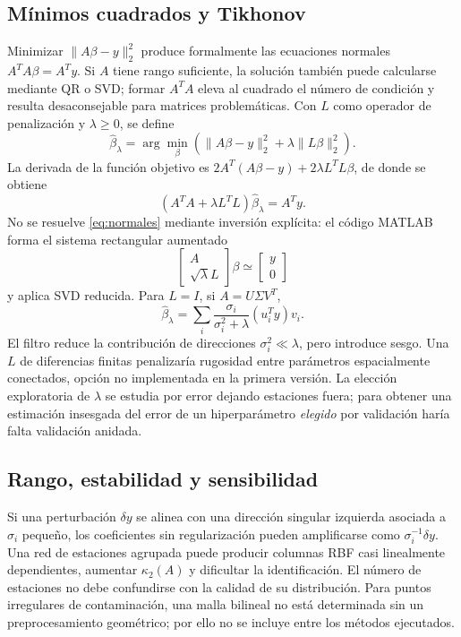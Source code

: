 \subsection{Mínimos cuadrados y Tikhonov}
Minimizar $\|A\beta-y\|_2^2$ produce formalmente las ecuaciones normales $A^TA\beta=A^Ty$. Si $A$ tiene rango suficiente, la solución también puede calcularse mediante QR o SVD; formar $A^TA$ eleva al cuadrado el número de condición y resulta desaconsejable para matrices problemáticas. Con $L$ como operador de penalización y $\lambda\geq0$, se define
\begin{equation}\widehat\beta_\lambda=\arg\min_\beta\left(\|A\beta-y\|_2^2+\lambda\|L\beta\|_2^2\right).\label{eq:tikh}\end{equation}
La derivada de la función objetivo es $2A^T(A\beta-y)+2\lambda L^TL\beta$, de donde se obtiene
\begin{equation}(A^TA+\lambda L^TL)\widehat\beta_\lambda=A^Ty.\label{eq:normales}\end{equation}
No se resuelve \eqref{eq:normales} mediante inversión explícita: el código MATLAB forma el sistema rectangular aumentado
\begin{equation}\left[\begin{array}{c}A\\\sqrt\lambda L\end{array}\right]\beta\simeq\left[\begin{array}{c}y\\0\end{array}\right]\label{eq:aumentado}\end{equation}
y aplica SVD reducida. Para $L=I$, si $A=U\Sigma V^T$,
\begin{equation}\widehat\beta_\lambda=\sum_{i}\frac{\sigma_i}{\sigma_i^2+\lambda}(u_i^Ty)v_i.\label{eq:filtros}\end{equation}
El filtro reduce la contribución de direcciones $\sigma_i^2\ll\lambda$, pero introduce sesgo. Una $L$ de diferencias finitas penalizaría rugosidad entre parámetros espacialmente conectados, opción no implementada en la primera versión. La elección exploratoria de $\lambda$ se estudia por error dejando estaciones fuera; para obtener una estimación insesgada del error de un hiperparámetro \emph{elegido} por validación haría falta validación anidada.

\subsection{Rango, estabilidad y sensibilidad}
Si una perturbación $\delta y$ se alinea con una dirección singular izquierda asociada a $\sigma_i$ pequeño, los coeficientes sin regularización pueden amplificarse como $\sigma_i^{-1}\delta y$. Una red de estaciones agrupada puede producir columnas RBF casi linealmente dependientes, aumentar $\kappa_2(A)$ y dificultar la identificación. El número de estaciones no debe confundirse con la calidad de su distribución. Para puntos irregulares de contaminación, una malla bilineal no está determinada sin un preprocesamiento geométrico; por ello no se incluye entre los métodos ejecutados.

